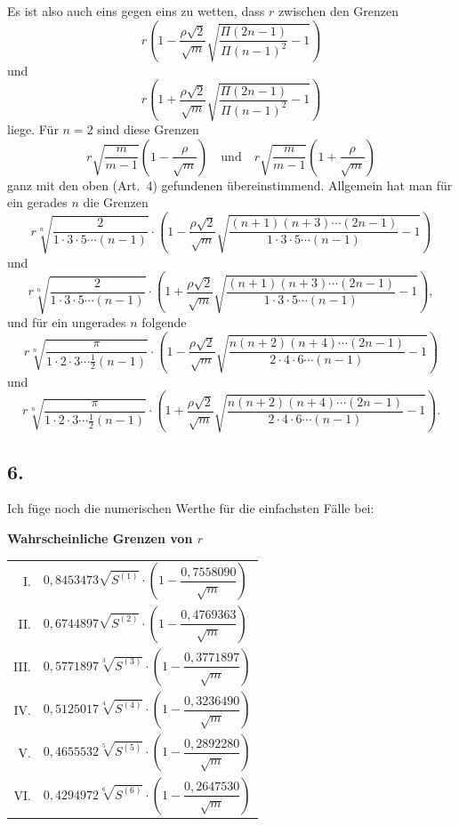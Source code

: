 \documentclass[12pt,a4paper]{article}
\begin{document}
Es ist also auch eins gegen eins zu wetten, dass $r$ zwischen den Grenzen
\[
r\left(1 - \frac{\rho\sqrt{2}}{\sqrt{m}}\sqrt{\frac{\Pi(2n-1)}{\Pi(n-1)^{2}} - 1}\right)
\]
und
\[
r\left(1 + \frac{\rho\sqrt{2}}{\sqrt{m}}\sqrt{\frac{\Pi(2n-1)}{\Pi(n-1)^{2}} - 1}\right)
\]
liege. F\"ur $n = 2$ sind diese Grenzen
\[
r\sqrt{\frac{m}{m-1}}\left(1 - \frac{\rho}{\sqrt{m}}\right) \quad\text{und}\quad r\sqrt{\frac{m}{m-1}}\left(1 + \frac{\rho}{\sqrt{m}}\right)
\]
ganz mit den oben (Art.\ 4) gefundenen \"ubereinstimmend. Allgemein hat man f\"ur ein gerades $n$ die Grenzen
\[
r\sqrt[n]{\frac{2}{1 \cdot 3 \cdot 5 \cdots (n-1)}} \cdot \left(1 - \frac{\rho\sqrt{2}}{\sqrt{m}}\sqrt{\frac{(n+1)(n+3)\cdots(2n-1)}{1 \cdot 3 \cdot 5 \cdots (n-1)} - 1}\right)
\]
und
\[
r\sqrt[n]{\frac{2}{1 \cdot 3 \cdot 5 \cdots (n-1)}} \cdot \left(1 + \frac{\rho\sqrt{2}}{\sqrt{m}}\sqrt{\frac{(n+1)(n+3)\cdots(2n-1)}{1 \cdot 3 \cdot 5 \cdots (n-1)} - 1}\right),
\]
und f\"ur ein ungerades $n$ folgende
\[
r\sqrt[n]{\frac{\pi}{1 \cdot 2 \cdot 3 \cdots \frac{1}{2}(n-1)}} \cdot \left(1 - \frac{\rho\sqrt{2}}{\sqrt{m}}\sqrt{\frac{n(n+2)(n+4)\cdots(2n-1)}{2 \cdot 4 \cdot 6 \cdots (n-1)} - 1}\right)
\]
und
\[
r\sqrt[n]{\frac{\pi}{1 \cdot 2 \cdot 3 \cdots \frac{1}{2}(n-1)}} \cdot \left(1 + \frac{\rho\sqrt{2}}{\sqrt{m}}\sqrt{\frac{n(n+2)(n+4)\cdots(2n-1)}{2 \cdot 4 \cdot 6 \cdots (n-1)} - 1}\right).
\]

\subsection*{6.}

Ich f\"uge noch die numerischen Werthe f\"ur die einfachsten F\"alle bei:

\begin{center}
\textbf{Wahrscheinliche Grenzen von $r$}
\end{center}

\begin{center}
\begin{tabular}{rl}
I. & $0{,}8453473\sqrt{S^{(1)}} \cdot \left(1 - \dfrac{0{,}7558090}{\sqrt{m}}\right)$ \\[1em]
II. & $0{,}6744897\sqrt{S^{(2)}} \cdot \left(1 - \dfrac{0{,}4769363}{\sqrt{m}}\right)$ \\[1em]
III. & $0{,}5771897\sqrt[3]{S^{(3)}} \cdot \left(1 - \dfrac{0{,}3771897}{\sqrt{m}}\right)$ \\[1em]
IV. & $0{,}5125017\sqrt[4]{S^{(4)}} \cdot \left(1 - \dfrac{0{,}3236490}{\sqrt{m}}\right)$ \\[1em]
V. & $0{,}4655532\sqrt[5]{S^{(5)}} \cdot \left(1 - \dfrac{0{,}2892280}{\sqrt{m}}\right)$ \\[1em]
VI. & $0{,}4294972\sqrt[6]{S^{(6)}} \cdot \left(1 - \dfrac{0{,}2647530}{\sqrt{m}}\right)$ \\[1em]
\end{tabular}
\end{center}
\end{document}
